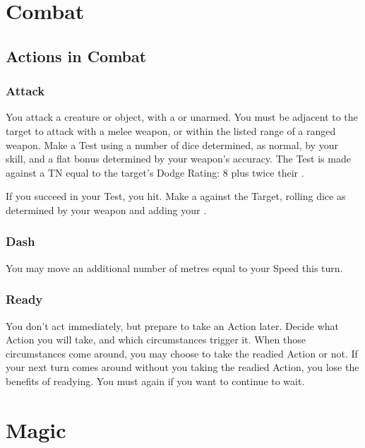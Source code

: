 \section{Combat}

\subsection{Actions in Combat}

\subsubsection{Attack}

You attack a creature or object, with a  or unarmed.
You must be adjacent to the target to attack with a melee weapon, or within the listed range of a ranged weapon.
Make a Test using a number of dice determined, as normal, by your  skill, and a flat bonus determined by your weapon's accuracy.
The Test is made against a TN equal to the target's Dodge Rating: 8 plus twice their .

If you succeed in your Test, you hit.
Make a  against the Target, rolling dice as determined by your weapon and adding your .

\subsubsection{Dash}

You may move an additional number of metres equal to your Speed this turn.

\subsubsection{Ready}

You don't act immediately, but prepare to take an Action later.
Decide what Action you will take, and which circumstances trigger it.
When those circumstances come around, you may choose to take the readied Action or not.
If your next turn comes around without you taking the readied Action, you lose the benefits of readying.
You must  again if you want to continue to wait.

\section{Magic}

